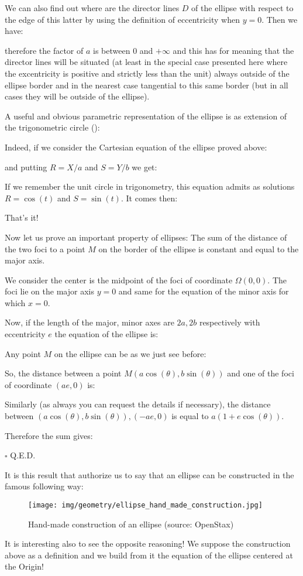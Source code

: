 \begin{enumerate}
		We can also find out where are the director lines $D$ of the ellipse with respect to the edge of this latter by using the definition of eccentricity when $y=0$. Then we have:
		
		
		therefore the factor of $a$ is between $0$ and $+\infty$ and this has for meaning that the director lines will be situated (at least in the special case presented here where the excentricity is positive and strictly less than the unit) always outside of the ellipse border and in the nearest case tangential to this same border (but in all cases they will be outside of the ellipse).
		
		A useful and obvious parametric representation of the ellipse is as extension of the trigonometric circle ():
		
		Indeed, if we consider the Cartesian equation of the ellipse proved above:
		
		and putting $R=X/a$ and $S=Y/b$ we get:
		
		If we remember the unit circle in trigonometry, this equation admits as solutions $R=\cos(t)$ and $S=\sin(t)$. It comes then:
		
		That's it!
		
		Now let us prove an important property of ellipses: The sum of the distance of the two foci to a point $M$ on the border of the ellipse is constant and equal to the major axis.
		
		\begin{dem}
		We consider the center is the midpoint of the foci of coordinate $\Omega(0,0)$. The foci lie on the major axis $y=0$ and same for the equation of the minor axis for which $x=0$.
		
		Now, if the length of the major, minor axes are $2a,2b$ respectively with eccentricity $e$ the equation of the ellipse is:
		
		Any point $M$ on the ellipse can be as we just see before:
		
		
		So, the distance between a point $M(a\cos(\theta),b\sin(\theta))$ and one of the foci of coordinate $(ae,0)$ is:
		
		Similarly (as always you can request the details if necessary), the distance between $(a\cos(\theta),b\sin(\theta)),(-ae,0)$ is equal to $a(1+e\cos(\theta))$.
		
		Therefore the sum gives:
		
		\begin{flushright}
			$\square$  Q.E.D.
		\end{flushright}
		\end{dem}
		It is this result that authorize us to say that an ellipse can be constructed in the famous following way:
		\begin{figure}[H]
			\centering
			\texttt{[image: img/geometry/ellipse\_hand\_made\_construction.jpg]}
			\caption{Hand-made construction of an ellipse (source: OpenStax)}
		\end{figure}
		It is interesting also to see the opposite reasoning! We suppose the construction above as a definition and we build from it the equation of the ellipse centered at the Origin!
		

\end{enumerate}
